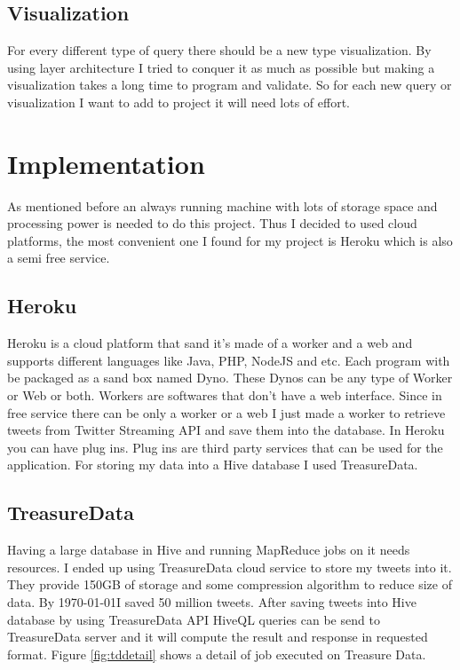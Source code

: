 \documentclass[a4paper,11pt]{report}
\begin{document}
\section{Visualization}
For every different type of query there should be a new type visualization. By using layer architecture I tried to conquer it as much as possible but making a visualization takes a long time to program and validate. So for each new query or visualization I want to add to project it will need lots of effort.

\chapter{Implementation}
As mentioned before an always running machine with lots of storage space and processing power is needed to do this project. Thus I decided to used cloud platforms, the most convenient one I found for my project is Heroku which is also a semi free service.

\section{Heroku}
Heroku is a cloud platform that sand it's made of a worker and a web and supports different languages like Java, PHP, NodeJS and etc. Each program with be packaged as a sand box named Dyno. These Dynos can be any type of Worker or Web or both. Workers are softwares that don't have a web interface. Since in free service there can be only a worker or a web I just made a worker to retrieve tweets from Twitter Streaming API and save them into the database. In Heroku you can have plug ins. Plug ins are third party services that can be used for the application. For storing my data into a Hive database I used TreasureData.
\section{TreasureData}
Having a large database in Hive and running MapReduce jobs on it needs resources. I ended up using TreasureData cloud service to store my tweets into it. They provide 150GB of storage and some compression algorithm to reduce size of data. By \today I saved 50 million tweets. After saving tweets into Hive database by using TreasureData API HiveQL queries can be send to TreasureData server and it will compute the result and response in requested format. Figure \ref{fig:tddetail} shows a detail of job executed on Treasure Data.
\end{document}
